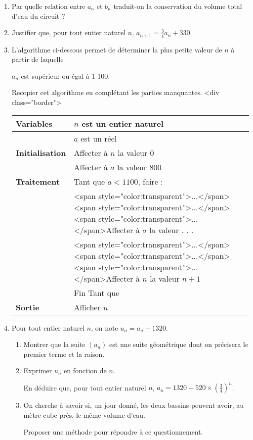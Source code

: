 \begin{enumerate}
     \item
     Par quelle relation entre $a_{n}$  et $b_{n}$  traduit-on la conservation du volume total d'eau du circuit ?
     \item
     Justifier que, pour tout entier naturel $n$, $a_{n+1} =\frac{3}{4}a_{n} + 330$.
     \item
     L'algorithme ci-dessous permet de déterminer la plus petite valeur de $n$ à partir de laquelle
     \par
     $a_{n}$ est supérieur ou égal à 1 100.
     \par
     Recopier cet algorithme en complétant les parties manquantes.
     <div class="border">
     \begin{tabularx}{0.8\linewidth}{|*{3}{>{\centering \arraybackslash }X|}}%
          \hline
          \textbf{Variables}  &  $n$ est un entier naturel
          \\ \hline
          & $a$ est un réel
          \\ \hline
          \textbf{Initialisation}  & Affecter à $n$ la valeur $0$
          \\ \hline
          & Affecter à $a$ la valeur $800$
          \\ \hline
          \textbf{Traitement	}  & Tant que $a < 1 100$, faire :
          \\ \hline
          & <span style="color:transparent">...</span><span style="color:transparent">...</span><span style="color:transparent">...</span>Affecter à $a$ la valeur . . .
          \\ \hline
          & <span style="color:transparent">...</span><span style="color:transparent">...</span><span style="color:transparent">...</span>Affecter à $n$ la valeur $n + 1$
          \\ \hline
          & Fin Tant que
          \\ \hline
          \textbf{Sortie}  & Afficher $n$
          \\ \hline
     \end{tabularx}
\item
Pour tout entier naturel $n$, on note $u_{n} = a_{n}-1 320$.
\begin{enumerate} [label=\alph*.]
     \item
     Montrer que la suite $\left(u_{n} \right)$ est une suite géométrique dont on précisera le premier terme et la raison.
     \item
     Exprimer $u_{n}$ en fonction de $n$.
     \par
     En déduire que, pour tout entier naturel $n$, $a_{n} = 1 320-520\times \left(\frac{3}{4}\right)^{n}$.
     \item
     On cherche à savoir si, un jour donné, les deux bassins peuvent avoir, au mètre cube près, le même volume d'eau.
     \par
     Proposer une méthode pour répondre à ce questionnement.
\end{enumerate}
\end{enumerate}
\begin{corrige}
\end{corrige}

